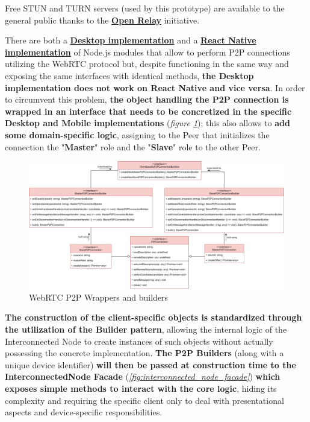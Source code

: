 Free STUN and TURN servers (used by this prototype) are available to the general public thanks to the \textbf{\href{https://www.metered.ca/tools/openrelay/}{Open Relay}} initiative.

There are both a \textbf{\href{https://www.npmjs.com/package/wrtc}{Desktop implementation}} and a \textbf{\href{https://www.npmjs.com/package/react-native-webrtc}{React Native implementation}} of Node.js modules that allow to perform P2P connections utilizing the WebRTC protocol but, despite functioning in the same way and exposing the same interfaces with identical methods, \textbf{the Desktop implementation does not work on React Native and vice versa}. In order to circumvent this problem, \textbf{the object handling the P2P connection is wrapped in an interface that needs to be concretized in the specific Desktop and Mobile implementations} (\textit{figure \ref{fig:p2p_wrapper}}); this also allows to \textbf{add some domain-specific logic}, assigning to the Peer that initializes the connection the "\textbf{Master}" role and the "\textbf{Slave}" role to the other Peer. 

\begin{figure}[!ht]
    \centering
    \includegraphics[width=\linewidth]{document/chapters/chapter_7/images/p2p_wrapper.png}
    \caption{WebRTC P2P Wrappers and builders}
    \label{fig:p2p_wrapper}
\end{figure}

\textbf{The construction of the client-specific objects is standardized through the utilization of the Builder pattern}, allowing the internal logic of the Interconnected Node to create instances of such objects without actually possessing the concrete implementation. \textbf{The P2P Builders} (along with a unique device identifier) \textbf{will then be passed at construction time to the InterconnectedNode Facade} (\textit{\ref{fig:interconnected_node_facade}}) \textbf{which exposes simple methods to interact with the core logic}, hiding its complexity and requiring the specific client only to deal with presentational aspects and device-specific responsibilities.

